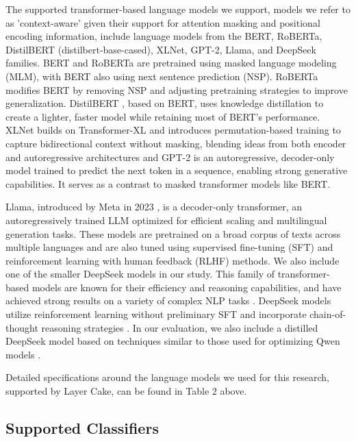 \documentclass[final]{clv2025}
\begin{document}
The supported transformer-based language models we support, models we refer to as 'context-aware' given their support for attention masking and positional encoding information, include language models from the BERT, RoBERTa, DistilBERT (distilbert-base-cased), XLNet, GPT-2, Llama, and DeepSeek families. BERT \cite{devlin-etal-2019-bert} and RoBERTa \cite{liu2019roberta} are pretrained using masked language modeling (MLM), with BERT also using next sentence prediction (NSP). RoBERTa modifies BERT by removing NSP and adjusting pretraining strategies to improve generalization. DistilBERT \cite{sanh2020distilbert}, based on BERT, uses knowledge distillation \cite{hinton2015distilling} to create a lighter, faster model while retaining most of BERT's performance. XLNet \cite{yang2019xlnet} builds on Transformer-XL \cite{dai2019transformer} and introduces permutation-based training to capture bidirectional context without masking, blending ideas from both encoder and autoregressive architectures and GPT-2 \cite{radford2019language} is an autoregressive, decoder-only model trained to predict the next token in a sequence, enabling strong generative capabilities. It serves as a contrast to masked transformer models like BERT. 

Llama, introduced by Meta in 2023 \cite{touvron2023llama}, is a decoder-only transformer, an autoregressively trained LLM optimized for efficient scaling and multilingual generation tasks. These models are pretrained on a broad corpus of texts across multiple languages and are also tuned using supervised fine-tuning (SFT) and reinforcement learning with human feedback (RLHF) methods. We also include one of the smaller DeepSeek models in our study. This family of transformer-based models are known for their efficiency and reasoning capabilities, and have achieved strong results on a variety of complex NLP tasks \cite{articlebi, guo2025deepseek}. DeepSeek models utilize reinforcement learning without preliminary SFT \cite{ouyang2022training} and incorporate chain-of-thought reasoning strategies \cite{articlewei}. In our evaluation, we also include a distilled DeepSeek model based on techniques similar to those used for optimizing Qwen models \cite{articlebai, hinton2015distilling}.

Detailed specifications around the language models we used for this research, supported by Layer Cake, can be found in Table 2 above.

\subsection{Supported Classifiers}
\end{document}
